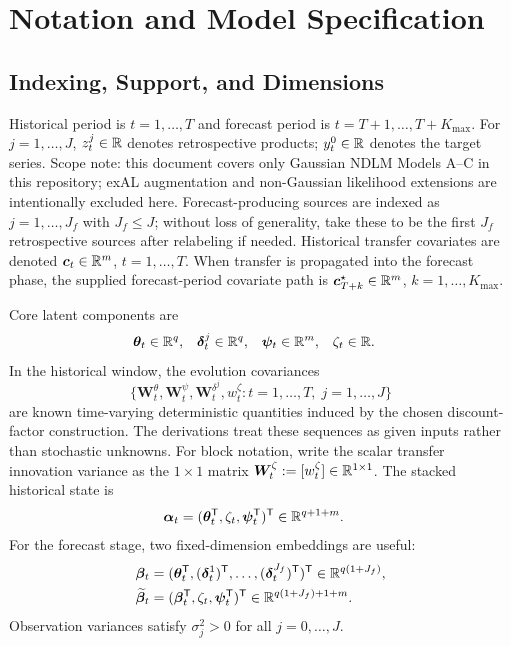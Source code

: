 \section{Notation and Model Specification}

\subsection{Indexing, Support, and Dimensions}
Historical period is $t=1,\dots,T$ and forecast period is $t=T+1,\dots,T+K_{\max}$.
For $j=1,\dots,J$, $z_t^j\in\mathbb{R}$ denotes retrospective products;
$y_t^0\in\mathbb{R}$ denotes the target series.
Scope note: this document covers only Gaussian NDLM Models A--C in this repository;
exAL augmentation and non-Gaussian likelihood extensions are intentionally excluded here.
Forecast-producing sources are indexed as $j=1,\dots,J_f$ with $J_f\le J$; without loss of
generality, take these to be the first $J_f$ retrospective sources after relabeling if needed.
Historical transfer covariates are denoted $\bm c_t\in\mathbb{R}^m$, $t=1,\dots,T$.
When transfer is propagated into the forecast phase, the supplied forecast-period covariate path is
$\bm c_{T+k}^\star\in\mathbb{R}^m$, $k=1,\dots,K_{\max}$.

Core latent components are
\begin{align}
\bm\theta_t &\in \mathbb{R}^q, &
\bm\delta_t^j &\in \mathbb{R}^q, &
\bm\psi_t &\in \mathbb{R}^m, &
\zeta_t &\in \mathbb{R}.
\end{align}
In the historical window, the evolution covariances
\[
\{\bm W_t^\theta,\bm W_t^\psi,\bm W_t^{\delta^j},w_t^\zeta\colon t=1,\dots,T,\; j=1,\dots,J\}
\]
are known time-varying deterministic quantities induced by the chosen discount-factor
construction. The derivations treat these sequences as given inputs rather than stochastic
unknowns. For block notation, write the scalar transfer innovation variance as the $1\times1$
matrix $\bm W_t^\zeta:=[w_t^\zeta]\in\mathbb{R}^{1\times1}$.
The stacked historical state is
\begin{align}
\bm\alpha_t &= (\bm\theta_t^{\mathsf{T}},\zeta_t,\bm\psi_t^{\mathsf{T}})^{\mathsf{T}} \in \mathbb{R}^{q+1+m}.
\end{align}
For the forecast stage, two fixed-dimension embeddings are useful:
\begin{align}
\bm\beta_t &= (\bm\theta_t^{\mathsf{T}},(\bm\delta_t^1)^{\mathsf{T}},\dots,(\bm\delta_t^{J_f})^{\mathsf{T}})^{\mathsf{T}} \in \mathbb{R}^{q(1+J_f)}, \\
\widetilde{\bm\beta}_t &= (\bm\beta_t^{\mathsf{T}},\zeta_t,\bm\psi_t^{\mathsf{T}})^{\mathsf{T}} \in \mathbb{R}^{q(1+J_f)+1+m}.
\end{align}
Observation variances satisfy $\sigma_j^2>0$ for all $j=0,\dots,J$.

